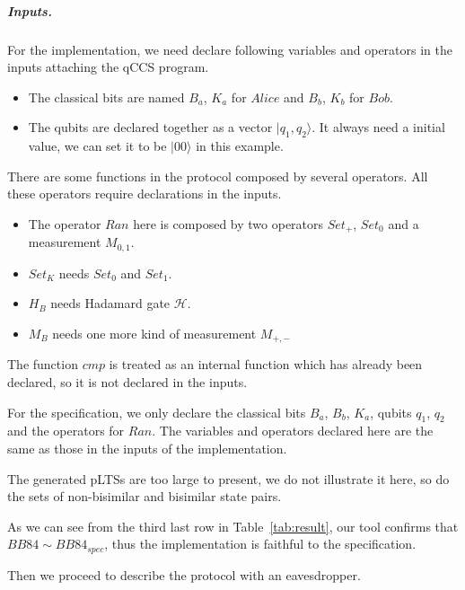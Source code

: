 \documentclass[a4paper,UKenglish,cleveref, autoref]{lipics-v2019}
\begin{document}
\subparagraph*{Inputs.}
For the implementation, we need declare following variables and operators in the inputs attaching the qCCS program.
\begin{itemize}
    \item The classical bits are named $B_a$, $K_a$ for $Alice$ and $B_b$, $K_b$ for $Bob$.
    \item The qubits are declared together as a vector $|q_1,q_2\rangle$. It always need a initial value, we can set it to be $|00\rangle$ in this example.
\end{itemize}
There are some functions in the protocol composed by several operators. All these operators require declarations in the inputs. 
\begin{itemize}
    \item The operator $Ran$ here is composed by two operators $Set_{+}$, $Set_{0}$ and a measurement $M_{0,1}$. 
    \item $Set_{K}$ needs $Set_{0}$ and $Set_{1}$.
    \item $H_{B}$ needs Hadamard gate $\mathcal{H}$.
    \item $M_{B}$ needs one more kind of measurement $M_{+,-}$
\end{itemize}
The function $cmp$ is treated as an internal function which has already been declared, so it is not declared in the inputs.

For the specification, we only declare the classical bits $B_a$, $B_b$, $K_a$, qubits $q_1$, $q_2$ and the operators for $Ran$. The variables and operators declared here are the same as those in the inputs of the implementation.

The generated pLTSs are too large to present, we do not illustrate it here, so do the sets of non-bisimilar and bisimilar state pairs. 

As we can see from the third last row in Table~\ref{tab:result}, our tool confirms that $BB84 \sim BB84_{spec}$, thus the implementation is faithful to the specification.

Then we proceed to describe the protocol with an eavesdropper. 
\end{document}
